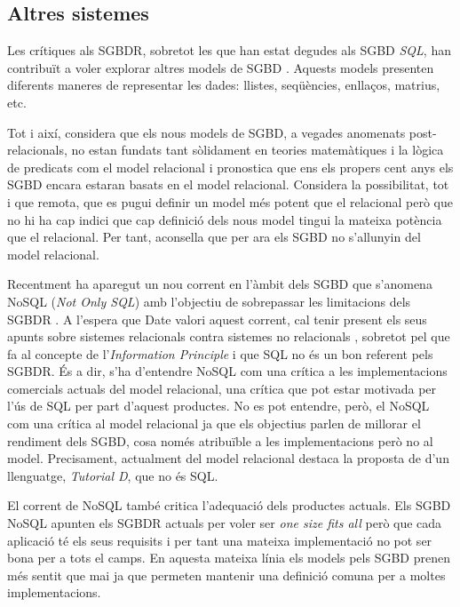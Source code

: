 \subsection{Altres sistemes}

Les crítiques als SGBDR, sobretot les que han estat degudes als SGBD
\emph{SQL}, han contribuït a voler explorar altres models de
SGBD \parencite{stonebraker09}. Aquests models presenten diferents
maneres de representar les dades: llistes, seqüències, enllaços,
matrius, etc.

Tot i així, \textcite[cap.~21--25]{date06} considera que els nous
models de SGBD, a vegades anomenats post-relacionals, no estan fundats
tant sòlidament en teories matemàtiques i la lògica de predicats com
el model relacional i pronostica que ens els propers cent anys els
SGBD encara estaran basats en el model
relacional. %
Considera la possibilitat, tot i que remota, que es pugui definir un
model més potent que el relacional però que no hi ha cap indici que
cap definició dels nous model tingui la mateixa potència que el
relacional. Per tant, aconsella que per ara els SGBD no s'allunyin del
model relacional. %




Recentment ha aparegut un nou corrent en l'àmbit dels SGBD que
s'anomena NoSQL (\emph{Not Only SQL}) amb l'objectiu de sobrepassar
les limitacions dels SGBDR \parencite{edlich:nosql,stonebraker10}.  A
l'espera que Date valori aquest corrent, cal tenir present els seus
apunts sobre sistemes relacionals contra sistemes no
relacionals \parencite[part 7]{date06}, sobretot pel que fa al
concepte de l'\emph{Information Principle} i que SQL no és un bon
referent pels SGBDR. És a dir, s'ha d'entendre NoSQL com una crítica a
les implementacions comercials actuals del model relacional, una
crítica que pot estar motivada per l'ús de SQL per part d'aquest
productes.  No es pot entendre, però, el NoSQL com una crítica al
model relacional ja que els objectius parlen de millorar el rendiment
dels SGBD, cosa només atribuïble a les implementacions però no al
model. Precisament, actualment del model relacional destaca la
proposta de \citeauthor{date:tutoriald} d'un llenguatge,
\emph{Tutorial D}, que no és SQL.


El corrent de NoSQL també critica l'adequació dels productes actuals.
Els SGBD NoSQL apunten els SGBDR actuals per voler ser \emph{one size
  fits all} \parencite{stonebraker07,stonebraker09} però que cada
aplicació té els seus requisits i per tant una mateixa implementació
no pot ser bona per a tots el camps.  En aquesta mateixa línia els
models pels SGBD prenen més sentit que mai ja que permeten mantenir
una definició comuna per a moltes implementacions.


